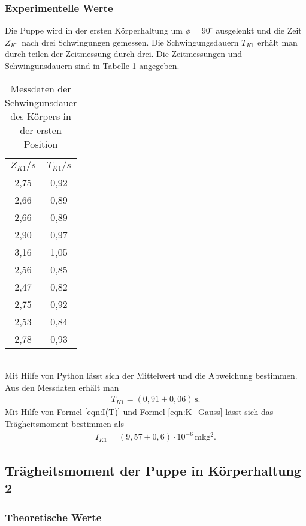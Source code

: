 \subsubsection{Experimentelle Werte}
Die Puppe wird in der ersten Körperhaltung um $\phi = 90^{\circ}$ ausgelenkt und die Zeit $Z_{K1}$ nach drei
Schwingungen gemessen. Die Schwingungsdauern $T_{K1}$ erhält man durch teilen der Zeitmessung durch drei. Die Zeitmessungen und
Schwingunsdauern sind in Tabelle \ref{tab:Koerper1} angegeben.
\begin{table}
  \centering
  \caption{Messdaten der Schwingunsdauer des Körpers in der ersten Position}
  \label{tab:Koerper1}
  \begin{tabular}{c c}
    \toprule
    $Z_{K1}/s$ & $T_{K1}/s$ \\
    \midrule
    2,75 & 0,92 \\
    2,66 & 0,89 \\
    2,66 & 0,89 \\
    2,90 & 0,97 \\
    3,16 & 1,05 \\
    2,56 & 0,85 \\
    2,47 & 0,82 \\
    2,75 & 0,92 \\
    2,53 & 0,84 \\
    2,78 & 0,93 \\
    \bottomrule
  \end{tabular}
\end{table}
\\
Mit Hilfe von Python lässt sich der Mittelwert und die Abweichung bestimmen. Aus den Messdaten
erhält man
\begin{align*}
  T_{K1} = (0{,}91 \pm 0{,}06)\, \mathrm{s} .
\end{align*}
Mit Hilfe von Formel \ref{eqn:I(T)} und Formel \ref{eqn:K_Gauss} lässt sich das Trägheitsmoment bestimmen als
\begin{align*}
  I_{K1} = (9{,}57 \pm 0{,}6) \cdot 10^{-6}\, \mathrm{mkg^2}.
\end{align*}

\subsection{Trägheitsmoment der Puppe in Körperhaltung 2}
\label{TraegheitsmomentderPuppeinKoerperhaltung2}
\subsubsection{Theoretische Werte}

